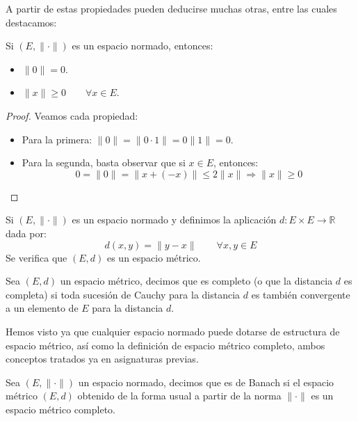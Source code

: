 A partir de estas propiedades pueden deducirse muchas otras, entre las cuales destacamos:
\begin{prop}
    Si $(E, \|\cdot \|)$ es un espacio normado, entonces:
    \begin{itemize}
        \item $\|0\| = 0$.
        \item $\|x\| \geq 0 \qquad \forall x\in E$.
    \end{itemize}
    \begin{proof}
        Veamos cada propiedad:
        \begin{itemize}
            \item Para la primera: $\|0\| = \|0\cdot 1\| = 0\|1\| = 0$.
            \item Para la segunda, basta observar que si $x\in E$, entonces:
                \begin{equation*}
                    0 = \|0\| = \|x + (-x)\| \leq 2\|x\| \Longrightarrow \|x\| \geq 0
                \end{equation*}
        \end{itemize}
    \end{proof}
\end{prop}

\begin{prop}
    Si $(E,\|\cdot \|)$ es un espacio normado y definimos la aplicación $d:E\times E\to \mathbb{R}$ dada por:
    \begin{equation*}
        d(x,y) = \|y-x\| \qquad \forall x,y\in E
    \end{equation*}
    Se verifica que $(E, d)$ es un espacio métrico.
\end{prop}

\begin{definicion}
    Sea $(E,d)$ un espacio métrico, decimos que es completo (o que la distancia $d$ es completa) si toda sucesión de Cauchy para la distancia $d$ es también convergente a un elemento de $E$ para la distancia $d$.
\end{definicion}

Hemos visto ya que cualquier espacio normado puede dotarse de estructura de espacio métrico, así como la definición de espacio métrico completo, ambos conceptos tratados ya en asignaturas previas.

\begin{definicion}
    Sea $(E,\|\cdot \|)$ un espacio normado, decimos que es de Banach si el espacio métrico $(E,d)$ obtenido de la forma usual a partir de la norma $\|\cdot \|$ es un espacio métrico completo.
\end{definicion}

